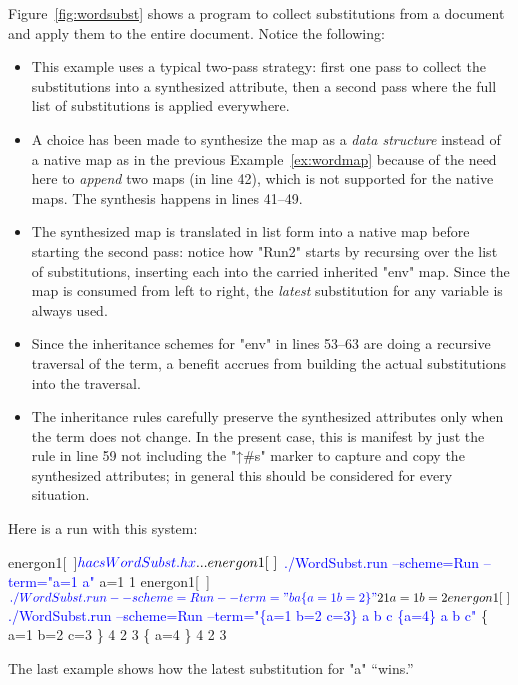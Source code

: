 \documentclass[12pt]{article} %
\begin{document}
\begin{example}
  Figure~\ref{fig:wordsubst} shows a \HAX program to collect substitutions from a document and apply
  them to the entire document.  Notice the following:
  \begin{itemize}

  \item This example uses a typical two-pass strategy: first one pass to collect the substitutions
    into a synthesized attribute, then a second pass where the full list of substitutions is applied
    everywhere.

  \item A choice has been made to synthesize the map as a \emph{data structure} instead of a native
    \HAX map as in the previous Example~\ref{ex:wordmap} because of the need here to \emph{append}
    two maps (in line 42), which is not supported for the native maps.  The synthesis happens in
    lines 41--49.

  \item The synthesized map is translated in list form into a native \HAX map before starting the
    second pass: notice how "Run2" starts by recursing over the list of substitutions, inserting
    each into the carried inherited "env" map.  Since the map is consumed from left to right, the
    \emph{latest} substitution for any variable is always used.

  \item Since the inheritance schemes for "env" in lines 53--63 are doing a recursive traversal of
    the term, a benefit accrues from building the actual substitutions into the traversal.

  \item The inheritance rules carefully preserve the synthesized attributes only when the term does
    not change. In the present case, this is manifest by just the rule in line 59 not including the
    "↑#s" marker to capture and copy the synthesized attributes; in general this should be
    considered for every situation.

  \end{itemize}
  Here is a run with this system:
\begin{code}[commandchars=\\\{\}]
energon1[~]$ \textcolor{blue}{hacs WordSubst.hx}
...
energon1[~]$ \textcolor{blue}{./WordSubst.run --scheme=Run --term="a=1 a"}
 a=1  1   
energon1[~]$ \textcolor{blue}{./WordSubst.run --scheme=Run --term="b a \{a=1 b=2\}"}
 2  1   {  a=1  b=2    }     
energon1[~]$ \textcolor{blue}{./WordSubst.run --scheme=Run --term="\{a=1 b=2 c=3\} a b c \{a=4\} a b c"}
  \{  a=1  b=2  c=3     \}   4  2  3   \{  a=4   \}   4  2  3         
\end{code}
  The last example shows how the latest substitution for "a" ``wins.''
\end{example}
\end{document}
